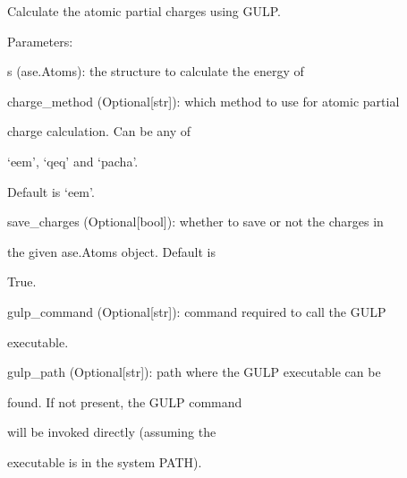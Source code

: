 \documentclass[letterpaper,10pt,english]{sphinxmanual}
\begin{document}
\begin{fulllineitems}
\label{doctree/soprano.calculate.gulp.charges:soprano.calculate.gulp.charges.get_gulp_charges}
Calculate the atomic partial charges using GULP.

\begin{DUlineblock}{0em}
\item[] Parameters:
\item[]
\begin{DUlineblock}{\DUlineblockindent}
\item[] s (ase.Atoms): the structure to calculate the energy of
\item[] charge\_method (Optional{[}str{]}): which method to use for atomic partial
\item[]
\begin{DUlineblock}{\DUlineblockindent}
\item[] charge calculation. Can be any of
\item[] `eem', `qeq' and `pacha'.
\item[] Default is `eem'.
\end{DUlineblock}
\item[] save\_charges (Optional{[}bool{]}): whether to save or not the charges in
\item[]
\begin{DUlineblock}{\DUlineblockindent}
\item[] the given ase.Atoms object. Default is
\item[] True.
\end{DUlineblock}
\item[] gulp\_command (Optional{[}str{]}): command required to call the GULP
\item[]
\begin{DUlineblock}{\DUlineblockindent}
\item[] executable.
\end{DUlineblock}
\item[] gulp\_path (Optional{[}str{]}): path where the GULP executable can be
\item[]
\begin{DUlineblock}{\DUlineblockindent}
\item[] found. If not present, the GULP command
\item[] will be invoked directly (assuming the
\item[] executable is in the system PATH).
\end{DUlineblock}
\end{DUlineblock}
\end{DUlineblock}


\end{fulllineitems}
\end{document}
